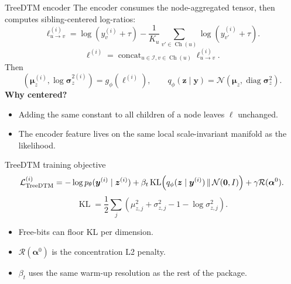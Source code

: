 \documentclass[aspectratio=169,10pt]{beamer}
\newcommand{\KL}{\operatorname{KL}}
\newcommand{\diag}{\operatorname{diag}}
\newcommand{\I}{\mathcal I}
\newcommand{\Ch}{\operatorname{Ch}}
\begin{document}
\begin{frame}{TreeDTM encoder}
\small
The encoder consumes the node-aggregated tensor, then computes sibling-centered log-ratios:
\[
\ell_{u\to v}^{(i)}
=
\log(y_v^{(i)}+\tau)
-
\frac{1}{K_u}\sum_{v'\in\Ch(u)}
\log(y_{v'}^{(i)}+\tau).
\]
\[
\bm\ell^{(i)}=\operatorname{concat}_{u\in\I,v\in\Ch(u)}\ell_{u\to v}^{(i)}.
\]
Then
\[
(\bm\mu_z^{(i)},\log\bm\sigma_z^{2(i)})
=g_\phi(\bm\ell^{(i)}),
\qquad
q_\phi(\bm z\mid\bm y)
=\mathcal N(\bm\mu_z,\diag\bm\sigma_z^2).
\]
\textbf{Why centered?}
\begin{itemize}
  \item Adding the same constant to all children of a node leaves \(\ell\) unchanged.
  \item The encoder feature lives on the same local scale-invariant manifold as the likelihood.
\end{itemize}
\end{frame}

\begin{frame}{TreeDTM training objective}
\small
\[
\mathcal L_{\rm TreeDTM}^{(i)}
=
-\log p_\theta(\bm y^{(i)}\mid\bm z^{(i)})
+\beta_t\KL\!\left(q_\phi(\bm z\mid\bm y^{(i)})\,\|\,\mathcal N(\bm0,I)\right)
+\gamma\mathcal R(\bm\alpha^0).
\]
\[
\KL=
\frac12\sum_j
\left(\mu_{z,j}^2+\sigma_{z,j}^2-1-\log\sigma_{z,j}^2\right).
\]
\begin{itemize}
  \item Free-bits can floor KL per dimension.
  \item \(\mathcal R(\bm\alpha^0)\) is the concentration L2 penalty.
  \item \(\beta_t\) uses the same warm-up resolution as the rest of the package.
\end{itemize}
\end{frame}
\end{document}
